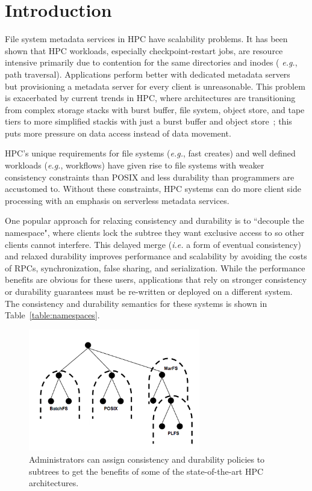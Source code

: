 \section{Introduction}

File system metadata services in HPC have scalability problems. It has been
shown that HPC workloads, especially checkpoint-restart jobs, are resource
intensive primarily due to contention for the same directories and inodes ({\it
e.g.}, path traversal). Applications perform better with dedicated metadata
servers~\cite{sevilla:sc15-mantle, ren:sc2014-indexfs} but provisioning a
metadata server for every client is unreasonable. This problem is exacerbated
by current trends in HPC, where architectures are transitioning from complex
storage stacks with burst buffer, file system, object store, and tape tiers to
more simplified stackis with just a burst buffer and object
store~\cite{bent:login16-hpc-trends}; this puts more pressure on data access
instead of data movement.

HPC's unique requirements for file systems ({\it e.g.}, fast creates) and well
defined workloads ({\it e.g.}, workflows) have given rise to file systems with
weaker consistency constraints than POSIX and less durability than programmers
are accustomed to.  Without these constraints, HPC systems can do more
client side processing with an emphasis on serverless metadata services.

One popular approach for relaxing consistency and durability is to ``decouple
the namespace", where clients lock the subtree they want exclusive access to so
other clients cannot interfere. This delayed merge ({\it i.e.} a form of
eventual consistency) and relaxed durability improves performance and
scalability by avoiding the costs of RPCs, synchronization, false sharing, and
serialization.  While the performance benefits are obvious for these users,
applications that rely on stronger consistency or durability guarantees must be
re-written or deployed on a different system. The consistency and durability
semantics for these systems is shown in Table~\ref{table:namespaces}.

\begin{figure}[tb]
\centering
\includegraphics[width=75mm]{figures/subtree-policies.png}
\caption{Administrators can assign consistency and durability policies to
subtrees to get the benefits of some of the state-of-the-art HPC architectures.
}\label{fig:subtree-policies}
\end{figure}

